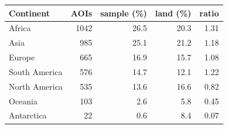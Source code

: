 \begin{tabular}{lrrrr}
\toprule
Continent & AOIs & sample (\%) & land (\%) & ratio \\
\midrule
Africa & 1042 & 26.5 & 20.3 & 1.31 \\
Asia & 985 & 25.1 & 21.2 & 1.18 \\
Europe & 665 & 16.9 & 15.7 & 1.08 \\
South America & 576 & 14.7 & 12.1 & 1.22 \\
North America & 535 & 13.6 & 16.6 & 0.82 \\
Oceania & 103 & 2.6 & 5.8 & 0.45 \\
Antarctica & 22 & 0.6 & 8.4 & 0.07 \\
\bottomrule
\end{tabular}
